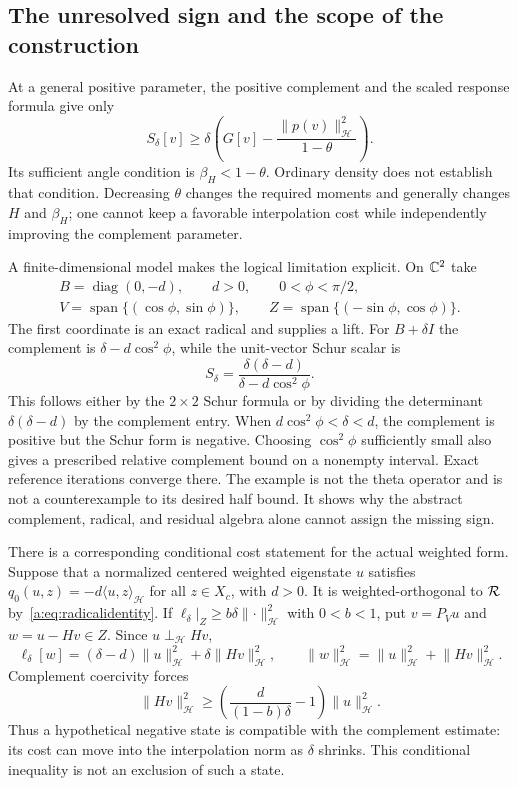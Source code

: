 \documentclass[11pt,a4paper]{article}
\numberwithin{equation}{section}
\theoremstyle{definition}\newtheorem{definition}[theorem]{Definition}
\theoremstyle{remark}\newtheorem{remark}[theorem]{Remark}
\newcommand{\Hh}{\mathcal H}\newcommand{\Hw}{\mathcal H}
\newcommand{\ip}[2]{\langle#1,#2\rangle}\newcommand{\norm}[1]{\lVert#1\rVert}\newcommand{\abs}[1]{\lvert#1\rvert}
\begin{document}
\subsection{The unresolved sign and the scope of the construction}\label{a:sec:scope}

At a general positive parameter, the positive complement and the scaled response formula give only
\begin{equation}\label{a:eq:anglebound}
 S_\delta[v]\ge\delta\left(G[v]
                 -\frac{\norm{p(v)}_{\Hh}^2}{1-\theta}\right).
\end{equation}
Its sufficient angle condition is $\beta_H<1-\theta$. Ordinary density does not establish that condition. Decreasing $\theta$ changes the required moments and generally changes $H$ and $\beta_H$; one cannot keep a favorable interpolation cost while independently improving the complement parameter.

A finite-dimensional model makes the logical limitation explicit. On $\mathbb C^2$ take
\[
 \begin{gathered}
 B=\operatorname{diag}(0,-d),\qquad d>0,\qquad0<\phi<\pi/2,\\
 V=\operatorname{span}\{(\cos\phi,\sin\phi)\},\qquad
 Z=\operatorname{span}\{(-\sin\phi,\cos\phi)\}.
 \end{gathered}
\]
The first coordinate is an exact radical and supplies a lift. For $B+\delta I$ the complement is $\delta-d\cos^2\phi$, while the unit-vector Schur scalar is
\begin{equation}\label{a:eq:model}
 S_\delta=\frac{\delta(\delta-d)}{\delta-d\cos^2\phi}.
\end{equation}
This follows either by the $2\times2$ Schur formula or by dividing the determinant $\delta(\delta-d)$ by the complement entry. When
$d\cos^2\phi<\delta<d$, the complement is positive but the Schur form is negative. Choosing $\cos^2\phi$ sufficiently small also gives a prescribed relative complement bound on a nonempty interval. Exact reference iterations converge there. The example is not the theta operator and is not a counterexample to its desired half bound. It shows why the abstract complement, radical, and residual algebra alone cannot assign the missing sign.

There is a corresponding conditional cost statement for the actual weighted form. Suppose that a normalized centered weighted eigenstate $u$ satisfies
$q_0(u,z)=-d\ip uz_{\Hh}$ for all $z\in X_c$, with $d>0$. It is weighted-orthogonal to $\mathcal R$ by~\eqref{a:eq:radicalidentity}. If
$\ell_\delta|_Z\ge b\delta\norm{\cdot}_{\Hh}^2$ with $0<b<1$, put
$v=P_Vu$ and $w=u-Hv\in Z$. Since $u\perp_{\Hh} Hv$,
\[
 \ell_\delta[w]=(\delta-d)\norm u_{\Hh}^2
                   +\delta\norm{Hv}_{\Hh}^2,
 \qquad
 \norm w_{\Hh}^2=\norm u_{\Hh}^2+\norm{Hv}_{\Hh}^2.
\]
Complement coercivity forces
\begin{equation}\label{a:eq:conditionalcost}
 \norm{Hv}_{\Hh}^2\ge
 \left(\frac{d}{(1-b)\delta}-1\right)\norm u_{\Hh}^2.
\end{equation}
Thus a hypothetical negative state is compatible with the complement estimate: its cost can move into the interpolation norm as $\delta$ shrinks. This conditional inequality is not an exclusion of such a state.
\end{document}
